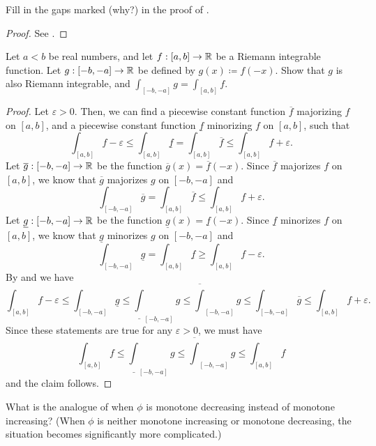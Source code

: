 \begin{ex}\label{i:ex:11.10.2}
  Fill in the gaps marked (why?) in the proof of .
\end{ex}

\begin{proof}
  See .
\end{proof}

\begin{ex}\label{i:ex:11.10.3}
  Let \(a < b\) be real numbers, and let \(f : [a, b] \to \mathbb{R}\) be a Riemann integrable function.
  Let \(g : [-b, -a] \to \mathbb{R}\) be defined by \(g(x) \coloneqq f(-x)\).
  Show that \(g\) is also Riemann integrable, and \(\int_{[-b, -a]} g = \int_{[a, b]} f\).
\end{ex}

\begin{proof}
  Let \(\varepsilon > 0\).
  Then, we can find a piecewise constant function \(\overline{f}\) majorizing \(f\) on \([a, b]\), and a piecewise constant function \(\underline{f}\) minorizing \(f\) on \([a, b]\), such that
  \[
    \int_{[a, b]} f - \varepsilon \leq \int_{[a, b]} \underline{f} = \int_{[a, b]} \overline{f} \leq \int_{[a, b]} f + \varepsilon.
  \]
  Let \(\overline{g} : [-b, -a] \to \mathbb{R}\) be the function \(\overline{g}(x) = \overline{f}(-x)\).
  Since \(\overline{f}\) majorizes \(f\) on \([a, b]\), we know that \(\overline{g}\) majorizes \(g\) on \([-b, -a]\) and
  \[
    \int_{[-b, -a]} \overline{g} = \int_{[a, b]} \overline{f} \leq \int_{[a, b]} f + \varepsilon.
  \]
  Let \(\underline{g} : [-b, -a] \to \mathbb{R}\) be the function \(\underline{g}(x) = \underline{f}(-x)\).
  Since \(\underline{f}\) minorizes \(f\) on \([a, b]\), we know that \(\underline{g}\) minorizes \(g\) on \([-b, -a]\) and
  \[
    \int_{[-b, -a]} \underline{g} = \int_{[a, b]} \underline{f} \geq \int_{[a, b]} f - \varepsilon.
  \]
  By  and  we have
  \[
    \int_{[a, b]} f - \varepsilon \leq \int_{[-b, -a]} \underline{g} \leq \underline{\int}_{[-b, -a]} g \leq \overline{\int}_{[-b, -a]} g \leq \int_{[-b, -a]} \overline{g} \leq \int_{[a, b]} f + \varepsilon.
  \]
  Since these statements are true for any \(\varepsilon > 0\), we must have
  \[
    \int_{[a, b]} f \leq \underline{\int}_{[-b, -a]} g \leq \overline{\int}_{[-b, -a]} g \leq \int_{[a, b]} f
  \]
  and the claim follows.
\end{proof}

\begin{ex}\label{i:ex:11.10.4}
  What is the analogue of  when \(\phi\) is monotone decreasing instead of monotone increasing?
  (When \(\phi\) is neither monotone increasing or monotone decreasing, the situation becomes significantly more complicated.)
\end{ex}

